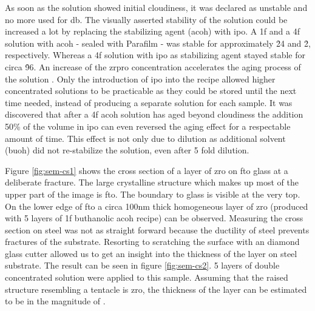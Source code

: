 As soon as the solution showed initial cloudiness, it was declared as unstable and no more used for \gls{db}. 
The visually asserted stability of the solution could be increased a lot by replacing the stabilizing agent (\gls{acoh}) with \gls{ipo}.
A \gls{1f} and a \gls{4f} solution with \gls{acoh} - sealed with Parafilm - was stable for approximately \h{24} and \h{2}, respectively.
Whereas a \gls{4f} solution with \gls{ipo} as stabilizing agent stayed stable for circa \h{96}. 
An increase of the \gls{zrpro} concentration accelerates the aging process of the solution .
Only the introduction of \gls{ipo} into the recipe allowed higher concentrated solutions to be practicable 
as they could be stored until the next time needed, instead of producing a separate solution for each sample.
%
It was discovered that after a \gls{4f} \gls{acoh} solution has aged beyond cloudiness 
the addition 50\% of the volume in \gls{ipo} can even reversed the aging effect for a respectable amount of time. 
This effect is not only due to dilution as additional solvent (\gls{buoh}) did not re-stabilize the solution, 
even after 5 fold dilution. 

Figure \ref{fig:sem-cs1} shows the cross section of a layer of \gls{zro} on \gls{fto} glass at a deliberate fracture.
The large crystalline structure which makes up most of the upper part of the image is \gls{fto}. 
The boundary to glass is visible at the very top. 
On the lower edge of \gls{fto} a circa 100nm thick homogeneous layer of \gls{zro} (produced with 5 layers of \gls{1f} buthanolic \gls{acoh} recipe)  can be observed.
Measuring the cross section on steel was not as straight forward because the ductility of steel prevents fractures of the substrate. 
Resorting to scratching the surface with an diamond glass cutter allowed us to get an insight into the thickness of the layer on steel substrate.
%
The result can be seen in figure \ref{fig:sem-cs2}. 
5 layers of double concentrated solution were applied to this sample. 
Assuming that the raised structure resembling a tentacle is \gls{zro}, 
the thickness of the layer can be estimated to be in the magnitude of .

